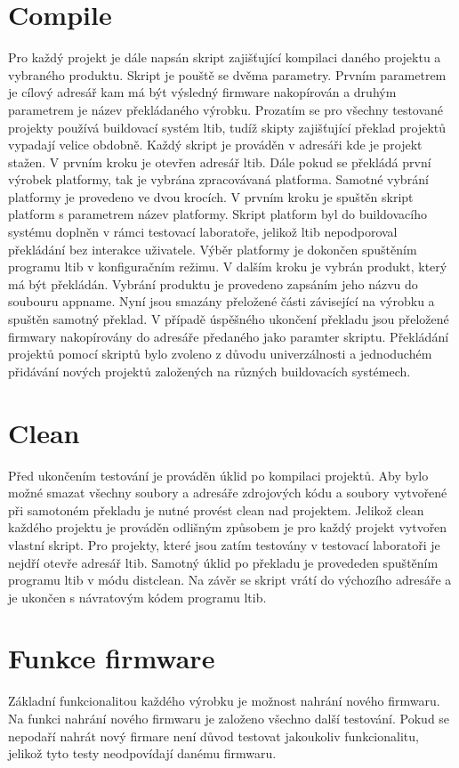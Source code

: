 \section{Compile}
Pro každý projekt je dále napsán skript zajišťující kompilaci daného projektu a vybraného produktu. Skript je pouště se dvěma parametry. Prvním parametrem je cílový adresář kam má být výsledný firmware nakopírován a druhým parametrem je název překládaného výrobku. Prozatím se pro všechny testované projekty používá buildovací systém ltib, tudíž skipty zajišťující překlad projektů vypadají velice obdobně. Každý skript je prováděn v adresáři kde je projekt stažen. V prvním kroku je otevřen adresář ltib. Dále pokud se překládá první výrobek platformy, tak je vybrána zpracovávaná platforma. Samotné vybrání platformy je provedeno ve dvou krocích. V prvním kroku je spuštěn skript platform s parametrem název platformy. Skript platform byl do buildovacího systému doplněn v rámci testovací laboratoře, jelikož ltib nepodporoval překládání bez interakce uživatele. Výběr platformy je dokončen spuštěním programu ltib v konfiguračním režimu. V dalším kroku je vybrán produkt, který má být překládán. Vybrání produktu je provedeno zapsáním jeho názvu do soubouru appname. Nyní jsou smazány přeložené části závisející na výrobku a spuštěn samotný překlad. V případě úspěšného ukončení překladu jsou přeložené firmwary nakopírovány do adresáře předaného jako paramter skriptu. Překládání projektů pomocí skriptů bylo zvoleno z důvodu univerzálnosti a jednoduchém přidávání nových projektů založených na různých buildovacích systémech.

\section{Clean}
Před ukončením testování je prováděn úklid po kompilaci projektů. Aby bylo možné smazat všechny soubory a adresáře zdrojových kódu a soubory vytvořené při samotoném překladu je nutné provést clean nad projektem. Jelikož clean každého projektu je prováděn odlišným způsobem  je pro každý projekt vytvořen vlastní skript. Pro projekty, které jsou zatím testovány v testovací laboratoři je nejdří otevře adresář ltib. Samotný úklid po překladu je provededen spuštěním programu ltib v módu distclean. Na závěr se skript vrátí do výchozího adresáře a je ukončen s návratovým kódem programu ltib.

\section{Funkce firmware}
Základní funkcionalitou každého výrobku je možnost nahrání nového firmwaru. Na funkci nahrání nového firmwaru je založeno všechno další testování. Pokud se nepodaří nahrát nový firmare není důvod testovat jakoukoliv funkcionalitu, jelikož tyto testy neodpovídají danému firmwaru.

